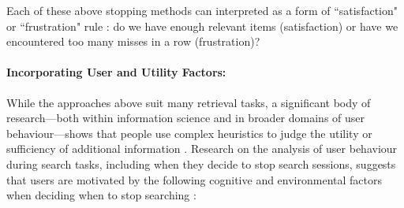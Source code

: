 \documentclass[10pt,oneside]{book}
\begin{document}
Each of these above stopping methods can interpreted as a form of ``satisfaction" or ``frustration" rule \cite{ilani_analysis_2024, cooper_selecting_1973}: do we have enough relevant items (satisfaction) or have we encountered too many misses in a row (frustration)?

\paragraph{Incorporating User and Utility Factors:}
While the approaches above suit many retrieval tasks, a significant body of research—both within information science and in broader domains of user behaviour—shows that people use complex heuristics to judge the utility or sufficiency of additional information \cite{nickles_judgment-based_1995, browne_stopping_2005, ilani_analysis_2024}. Research on the analysis of user behaviour during search tasks, including when they decide to stop search sessions, suggests that users are motivated by the following cognitive and environmental factors when deciding when to stop searching \cite{ilani_analysis_2024}:
\end{document}
